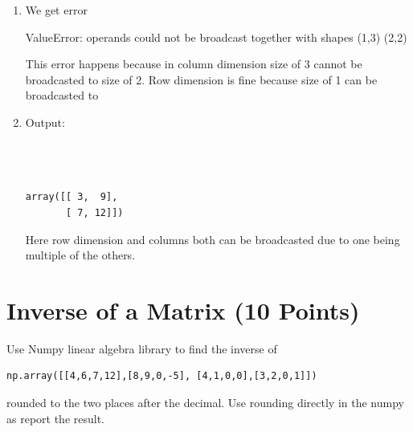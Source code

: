 \documentclass[12pt, xcolor=dvipsnames,svgnames,x11names]{article}
\begin{document}
\begin{answerbox}
\begin{enumerate}


\item 

We get error

ValueError: operands could not be broadcast together with shapes (1,3) (2,2) 

This error happens because in column dimension size of 3 cannot be broadcasted to size of 2. Row dimension is fine because size of 1 can be broadcasted to 

\item 

Output:
\begin{verbatim}
      


array([[ 3,  9],
       [ 7, 12]])
\end{verbatim}

Here row dimension and columns both can be broadcasted due to one being multiple of the others.

\end{enumerate}
\end{answerbox}


\section{Inverse of a Matrix (10 Points)}
Use Numpy linear algebra library to find the inverse of 


\begin{verbatim}
np.array([[4,6,7,12],[8,9,0,-5], [4,1,0,0],[3,2,0,1]])
\end{verbatim}

rounded to the two places after the decimal. Use rounding directly in the numpy as report the result.
\end{document}
